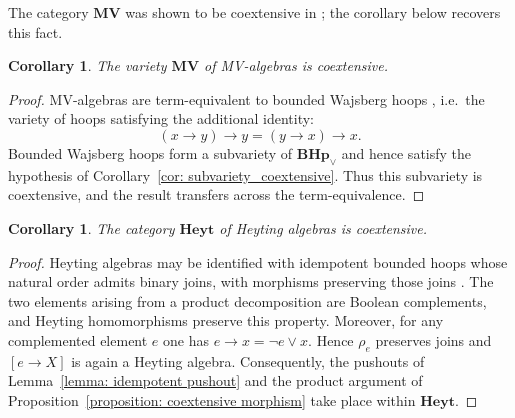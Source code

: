 \documentclass[11pt]{article}
\theoremstyle{pretty}
\newtheorem{corollary}[theorem]{Corollary}
\theoremstyle{plainnote}
\renewcommand{\2}{\mathbf{2}}
\newcommand{\BoundedHoop}{\mathbf{BHp}}
\begin{document}
The category $\mathbf{MV}$ was shown to be coextensive in \cite[Proposition~5.6]{MarraMenni2024}; the corollary below recovers this fact.
\begin{corollary} \label{cor: mv_coextensive}
The variety $\mathbf{MV}$ of MV-algebras is coextensive.
\end{corollary}
\begin{proof}
MV-algebras are term-equivalent to bounded Wajsberg hoops \cite{FontRodriguezTorrens1984,AglianoMontagna2003VarietiesBL}, i.e.\ the variety of hoops satisfying the additional identity:
\[
(x\to y)\to y= (y\to x)\to x.
\]
Bounded Wajsberg hoops form a subvariety of $\BoundedHoop_\vee$ and hence satisfy the hypothesis of Corollary~\ref{cor: subvariety_coextensive}. Thus this subvariety is coextensive, and the result transfers across the term-equivalence.
\end{proof}

\begin{corollary} \label{cor: heyt_coextensive}
The category $\mathbf{Heyt}$ of Heyting algebras is coextensive. 
\end{corollary}
\begin{proof}
Heyting algebras may be identified with idempotent bounded hoops whose natural order admits binary joins, with morphisms preserving those joins \cite{BlokFerreirim2000StructureHoops}. The two elements arising from a product decomposition are Boolean complements, and Heyting homomorphisms preserve this property. Moreover, for any complemented element $e$ one has $e\to x=\neg e\vee x$. Hence $\rho_e$ preserves joins and $[e\to X]$ is again a Heyting algebra. Consequently, the pushouts of Lemma~\ref{lemma: idempotent pushout} and the product argument of Proposition~\ref{proposition: coextensive morphism} take place within $\mathbf{Heyt}$.
\end{proof}
\end{document}
